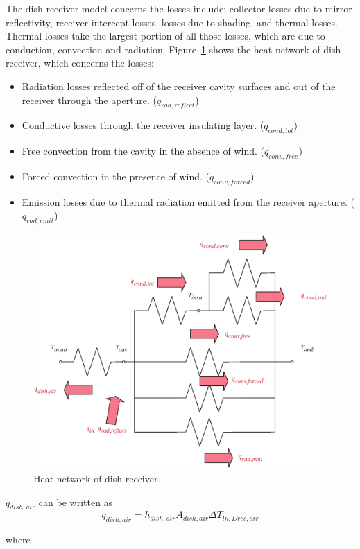\documentclass{article}
\begin{document}
The dish receiver model concerns the losses include: collector losses due to mirror reflectivity, receiver intercept losses, losses due to shading, and thermal losses. Thermal losses take the largest portion of all those losses, which are due to conduction, convection and radiation. Figure~\ref{fig:thermal-lose} shows the heat network of dish receiver, which concerns the losses:
\begin{itemize}
	\item Radiation losses reflected off of the receiver cavity surfaces and out of the receiver through the aperture. ($q_{rad,reflect}$)
	\item Conductive losses through the receiver insulating layer. ($q_{cond,tot}$)
	\item Free convection from the cavity in the absence of wind. ($q_{conv,free}$)
	\item Forced convection in the presence of wind. ($q_{conv,forced}$)
	\item Emission losses due to thermal radiation emitted from the receiver aperture. ($q_{rad,emit}$)
\end{itemize}

\noindent \begin{figure}[htbp]
\begin{center}
	\includegraphics[width = 0.7\columnwidth]{./graphics/thermalLosses}
	\caption{Heat network of dish receiver}
	\label{fig:thermal-lose}
\end{center}
\end{figure}

$q_{dish,air}$ can be written as
\begin{equation*}
	q_{dish,air}=h_{dish,air}A_{dish,air}\Delta{}T_{ln,Drec,air}
\end{equation*}

where
\end{document}
